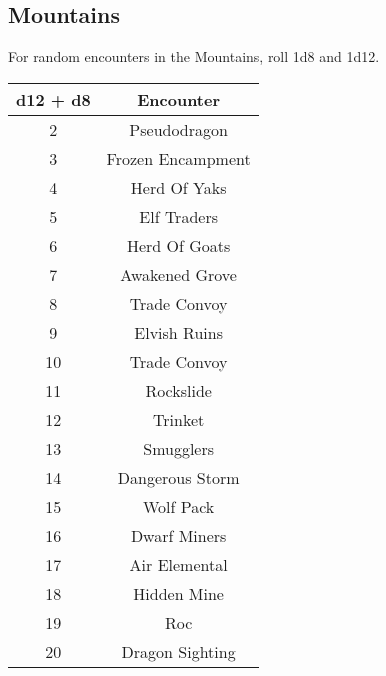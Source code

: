 \subsection{Mountains}

For random encounters in the Mountains, roll 1d8 and 1d12.

\begin{tabular}{|c|c|}

\hline

\textbf{d12 + d8} & \textbf{Encounter}\\

\hline

2 & Pseudodragon\\

3 & Frozen Encampment\\

4 & Herd Of Yaks\\

5 & Elf Traders\\

6 & Herd Of Goats\\

7 & Awakened Grove\\

8 & Trade Convoy\\

9 & Elvish Ruins\\

10 & Trade Convoy\\

11 & Rockslide\\

12 & Trinket\\

13 & Smugglers\\

14 & Dangerous Storm\\

15 & Wolf Pack\\

16 & Dwarf Miners\\

17 & Air Elemental\\

18 & Hidden Mine\\

19 & Roc\\

20 & Dragon Sighting\\

\hline

\end{tabular}

